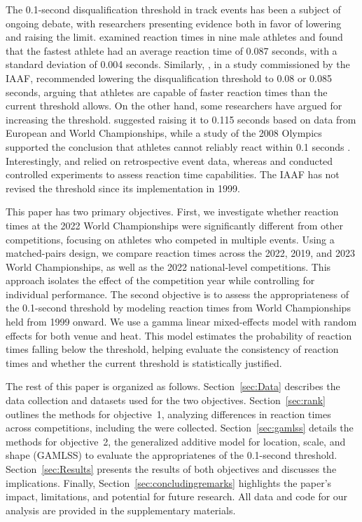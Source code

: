 \documentclass[12pt, letterpaper]{article}
\begin{document}
The 0.1-second disqualification threshold in track events has been 
a subject of ongoing debate, with researchers presenting evidence 
both in favor of lowering and raising the
limit. \citet{pain2007sprint} examined
reaction times in nine male athletes and found that the fastest athlete 
had an average reaction time of 0.087 seconds, with a standard deviation 
of 0.004 seconds. Similarly, \citet{komi2009iaaf}, in a study commissioned 
by the IAAF, recommended lowering the disqualification threshold to 0.08 
or 0.085 seconds, arguing that athletes are capable of faster reaction 
times than the current threshold allows. On the other hand, some 
researchers have argued for increasing the threshold.
\citet{brosnan2017effects} suggested raising it to 0.115 seconds based
on data from European and World Championships, while a study of the
2008 Olympics supported the conclusion that athletes cannot reliably
react within 0.1 seconds \citep{lipps2011implications}. Interestingly,
\citet{brosnan2017effects} and \citet{lipps2011implications} relied on
retrospective event data, whereas \citet{pain2007sprint} and
\citet{komi2009iaaf} conducted controlled experiments to assess
reaction time capabilities. The IAAF has not revised the threshold
since its implementation in 1999.


This paper has two primary objectives. First, we investigate whether 
reaction times at the 2022 World Championships were significantly 
different from other competitions, focusing on athletes who competed 
in multiple events. Using a matched-pairs design, we compare reaction 
times across the 2022, 2019, and 2023 World Championships, as well as 
the 2022 national-level competitions. This approach isolates the 
effect of the competition year while controlling for individual 
performance. The second objective is to assess the 
appropriateness of the 0.1-second threshold by modeling reaction 
times from World Championships held from 1999 onward. We use a gamma 
linear mixed-effects model with random effects for both venue and heat. 
This model estimates the probability of reaction times falling below 
the threshold, helping evaluate the consistency of reaction times and 
whether the current threshold is statistically justified.


The rest of this paper is organized as follows. Section~\ref{sec:Data} 
describes the data collection and datasets used for the two
objectives. Section~\ref{sec:rank} outlines the methods for
objective~1, analyzing differences in reaction times across
competitions, including the were collected. Section~\ref{sec:gamlss}
details the methods for objective~2, the generalized additive model
for location, scale, and shape (GAMLSS) to evaluate the appropriatenes
of the 0.1-second threshold. Section~\ref{sec:Results} presents the
results of both objectives and discusses the implications.
Finally, Section~\ref{sec:concludingremarks} highlights the 
paper’s impact, limitations, and potential for future research.
All data and code for our analysis 
are provided in the supplementary materials.
\end{document}
